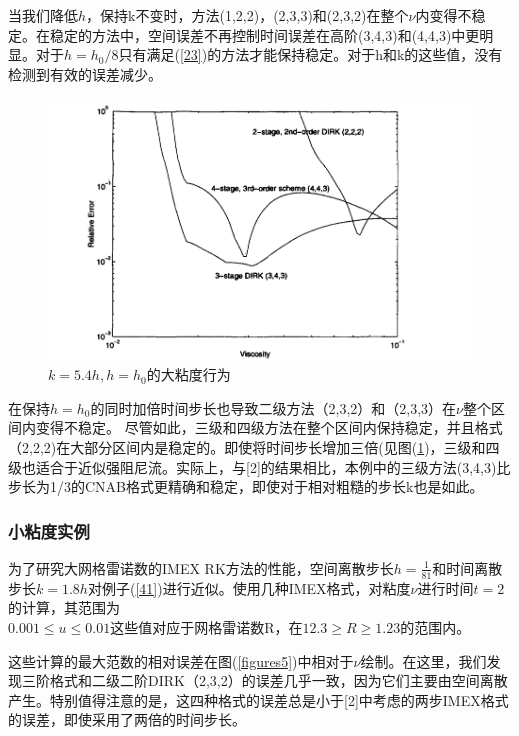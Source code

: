 \documentclass[12pt,a4paper]{article}
\numberwithin{equation}{section}
\begin{document}
当我们降低$h$，保持k不变时，方法(1,2,2)，(2,3,3)和(2,3,2)在整个$\nu $内变得不稳定。在稳定的方法中，空间误差不再控制时间误差在高阶(3,4,3)和(4,4,3)中更明显。对于$h=h_{0}/8$只有满足(\ref{23})的方法才能保持稳定。对于h和k的这些值，没有检测到有效的误差减少。
\begin{figure}[H]
\includegraphics[width=15cm]{./figures/4.png}
\caption{$k=5.4h,h=h_{0}$的大粘度行为}
\centering
\label{figures4}
\end{figure}

在保持$h=h_{0}$的同时加倍时间步长也导致二级方法（2,3,2）和（2,3,3）在$\nu$整个区间内变得不稳定。 尽管如此，三级和四级方法在整个区间内保持稳定，并且格式（2,2,2)在大部分区间内是稳定的。即使将时间步长增加三倍(见图(\ref{figures4})，三级和四级也适合于近似强阻尼流。实际上，与[2]的结果相比，本例中的三级方法(3,4,3)比步长为1/3的CNAB格式更精确和稳定，即使对于相对粗糙的步长k也是如此。

\subsubsection{小粘度实例}

为了研究大网格雷诺数的IMEX RK方法的性能，空间离散步长$h=\frac{1}{81}$和时间离散步长$k=1.8h$对例子(\ref{41})进行近似。使用几种IMEX格式，对粘度$\nu $进行时间$t = 2$的计算，其范围为\\$0.001\le u\le 0.01$这些值对应于网格雷诺数R，在$12.3\ge R \ge 1.23$的范围内。

这些计算的最大范数的相对误差在图(\ref{figures5})中相对于$\nu$绘制。在这里，我们发现三阶格式和二级二阶DIRK（2,3,2）的误差几乎一致，因为它们主要由空间离散产生。特别值得注意的是，这四种格式的误差总是小于[2]中考虑的两步IMEX格式的误差，即使采用了两倍的时间步长。
\end{document}
